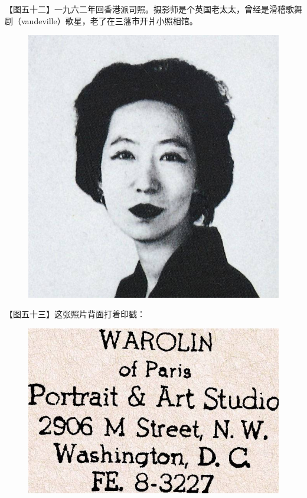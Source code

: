 \clearpage
\par 【图五十二】一九六二年回香港派司照。摄影师是个英国老太太，曾经是滑稽歌舞剧（vaudeville）歌星，老了在三藩市开爿小照相馆。
\begin{figure}[htb]
    \centering %
    \includegraphics[scale=0.5]{picture/对照记52.jpeg}
\end{figure}

\clearpage
\par 【图五十三】这张照片背面打着印戳：
\begin{figure}[htb]
    \centering %
    \includegraphics[scale=0.4]{picture/对照记53_1.jpeg}
\end{figure}


